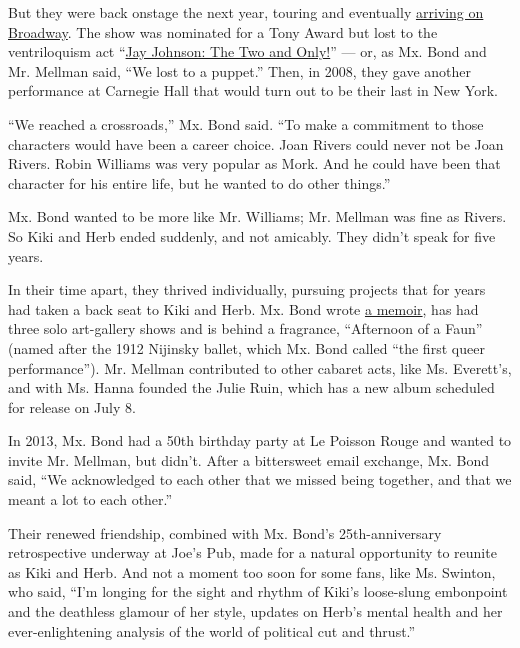 But they were back onstage the next year, touring and eventually
\href{http://www.nytimes3xbfgragh.onion/2006/08/16/theater/reviews/16kiki.html}{arriving
on Broadway}. The show was nominated for a Tony Award but lost to the
ventriloquism act
``\href{http://www.nytimes3xbfgragh.onion/2006/09/29/theater/reviews/29john.html}{Jay
Johnson: The Two and Only!}'' --- or, as Mx. Bond and Mr. Mellman said,
``We lost to a puppet.'' Then, in 2008, they gave another performance at
Carnegie Hall that would turn out to be their last in New York.

``We reached a crossroads,'' Mx. Bond said. ``To make a commitment to
those characters would have been a career choice. Joan Rivers could
never not be Joan Rivers. Robin Williams was very popular as Mork. And
he could have been that character for his entire life, but he wanted to
do other things.''

Mx. Bond wanted to be more like Mr. Williams; Mr. Mellman was fine as
Rivers. So Kiki and Herb ended suddenly, and not amicably. They didn't
speak for five years.

In their time apart, they thrived individually, pursuing projects that
for years had taken a back seat to Kiki and Herb. Mx. Bond wrote
\href{http://www.nytimes3xbfgragh.onion/2011/09/04/books/review/tango-my-childhood-backwards-and-in-high-heels-by-justin-vivian-bond-book-review.html}{a
memoir}, has had three solo art-gallery shows and is behind a fragrance,
``Afternoon of a Faun'' (named after the 1912 Nijinsky ballet, which Mx.
Bond called ``the first queer performance''). Mr. Mellman contributed to
other cabaret acts, like Ms. Everett's, and with Ms. Hanna founded the
Julie Ruin, which has a new album scheduled for release on July 8.

In 2013, Mx. Bond had a 50th birthday party at Le Poisson Rouge and
wanted to invite Mr. Mellman, but didn't. After a bittersweet email
exchange, Mx. Bond said, ``We acknowledged to each other that we missed
being together, and that we meant a lot to each other.''

Their renewed friendship, combined with Mx. Bond's 25th-anniversary
retrospective underway at Joe's Pub, made for a natural opportunity to
reunite as Kiki and Herb. And not a moment too soon for some fans, like
Ms. Swinton, who said, ``I'm longing for the sight and rhythm of Kiki's
loose-slung embonpoint and the deathless glamour of her style, updates
on Herb's mental health and her ever-enlightening analysis of the world
of political cut and thrust.''

